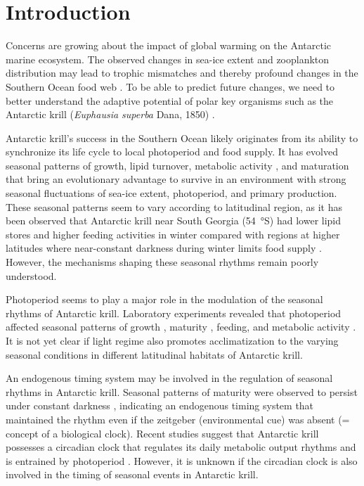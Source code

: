 \section{Introduction}

Concerns are growing about the impact of global warming on the Antarctic marine
ecosystem. The observed changes in sea-ice extent and zooplankton distribution
may lead to trophic mismatches and thereby profound changes in the Southern
Ocean food web \citep{atkinson_long-term_2004, steinberg_long-term_2015}. To be
able to predict future changes, we need to better understand the adaptive
potential of polar key organisms such as the Antarctic krill (\textit{Euphausia
superba} Dana, 1850) \citep{meyer_seasonal_2010}.

Antarctic krill’s success in the Southern Ocean likely originates from its
ability to synchronize its life cycle to local photoperiod and food supply. It
has evolved seasonal patterns of growth, lipid turnover, metabolic activity
\citep{meyer_seasonal_2010}, and maturation \citep{kawaguchi_learning_2007}
that bring an evolutionary advantage to survive in an environment with strong
seasonal fluctuations of sea-ice extent, photoperiod, and primary production.
These seasonal patterns seem to vary according to latitudinal region, as it has
been observed that Antarctic krill near South Georgia (\SI{54}{\degree}S) had
lower lipid stores and higher feeding activities in winter compared with
regions at higher latitudes where near-constant darkness during winter limits
food supply \citep{schmidt_feeding_2014}. However, the mechanisms shaping these
seasonal rhythms remain poorly understood.

Photoperiod seems to play a major role in the modulation of the seasonal
rhythms of Antarctic krill. Laboratory experiments revealed that photoperiod
affected seasonal patterns of growth \citep{brown_temperature_2010}, maturity
\citep{hirano_antarctic_2003, teschke_effects_2008, brown_flexible_2011},
feeding, and metabolic activity \citep{teschke_simulated_2007}. It is not yet
clear if light regime also promotes acclimatization to the varying seasonal
conditions in different latitudinal habitats of Antarctic krill.

An endogenous timing system may be involved in the regulation of seasonal
rhy\-thms in Antarctic krill. Seasonal patterns of maturity were observed to
persist under constant darkness \citep{brown_flexible_2011}, indicating an
endogenous timing system that maintained the rhythm even if the zeitgeber
(environmental cue) was absent (= concept of a biological clock). Recent
studies suggest that Antarctic krill possesses a circadian clock that regulates
its daily metabolic output rhythms and is entrained by photoperiod
\citep{mazzotta_cry_2010, teschke_circadian_2011}. However, it is unknown if
the circadian clock is also involved in the timing of seasonal events in
Antarctic krill.

